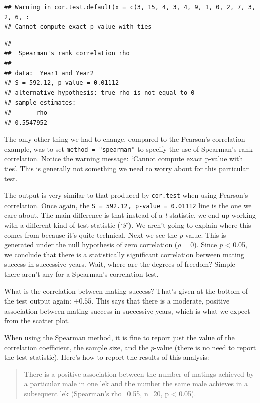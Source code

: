 \documentclass[
]{book}
\begin{document}
\begin{verbatim}
## Warning in cor.test.default(x = c(3, 15, 4, 3, 4, 9, 1, 0, 2, 7, 3, 2, 6, :
## Cannot compute exact p-value with ties
\end{verbatim}

\begin{verbatim}
## 
##  Spearman's rank correlation rho
## 
## data:  Year1 and Year2
## S = 592.12, p-value = 0.01112
## alternative hypothesis: true rho is not equal to 0
## sample estimates:
##       rho 
## 0.5547952
\end{verbatim}

The only other thing we had to change, compared to the Pearson's correlation example, was to set \texttt{method\ =\ "spearman"} to specify the use of Spearman's rank correlation. Notice the warning message: `Cannot compute exact p-value with ties'. This is generally not something we need to worry about for this particular test.

The output is very similar to that produced by \texttt{cor.test} when using Pearson's correlation. Once again, the \texttt{S\ =\ 592.12,\ p-value\ =\ 0.01112} line is the one we care about. The main difference is that instead of a \emph{t}-statistic, we end up working with a different kind of test statistic (`\emph{S}'). We aren't going to explain where this comes from because it's quite technical. Next we see the \emph{p}-value. This is generated under the null hypothesis of zero correlation (\(\rho = 0\)). Since \emph{p} \textless{} 0.05, we conclude that there is a statistically significant correlation between mating success in successive years. Wait, where are the degrees of freedom? Simple---there aren't any for a Spearman's correlation test.

What is the correlation between mating success? That's given at the bottom of the test output again: \(+0.55\). This says that there is a moderate, positive association between mating success in successive years, which is what we expect from the scatter plot.

When using the Spearman method, it is fine to report just the value of the correlation coefficient, the sample size, and the \emph{p}-value (there is no need to report the test statistic). Here's how to report the results of this analysis:

\begin{quote}
There is a positive association between the number of matings achieved by a particular male in one lek and the number the same male achieves in a subsequent lek (Spearman's rho=0.55, n=20, p \textless{} 0.05).
\end{quote}
\end{document}
